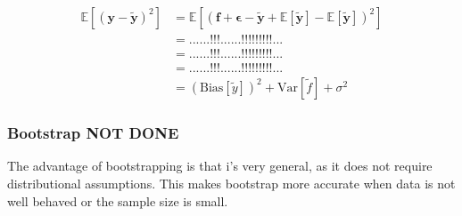 \begin{align*}
\mathbb{E}\left[(\mathbf{y}-\mathbf{\tilde{y}})^2\right]
&=\mathbb{E}\left[(\mathbf{f}+\mathbf{\epsilon}-\mathbf{\tilde{y}}+\mathbb{E}\left[\mathbf{\tilde{y}}\right]-\mathbb{E}\left[\mathbf{\tilde{y}}\right])^2\right]
\\
&= ... ... !!! ... ... !!! !!! !!! ...
\\
&= ... ... !!! ... ... !!! !!! !!! ...
\\
&= ... ... !!! ... ... !!! !!! !!! ...
\\
&=\left(\mbox{Bias}\left[{\tilde y}\right] \right)^2 + \mbox{Var}\left[{\tilde f} \right] + \sigma^2
\end{align*}





\subsubsection{Bootstrap NOT DONE}
The advantage of bootstrapping is that i's very general, as it does not require distributional assumptions. This makes bootstrap more accurate when data is not well behaved or the sample size is small. 

